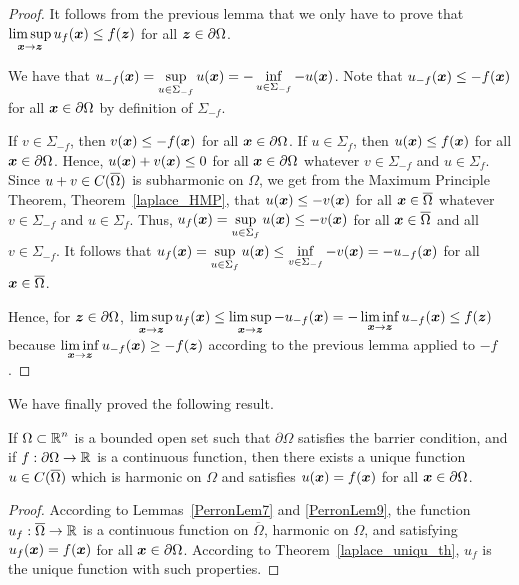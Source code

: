 \begin{proof}
It follows from the previous lemma that we only have to prove that
$\displaystyle \limsup_{{\bm{x}}\to {\bm{z}}} u_f({\bm{x}}) \leq f({\bm{z}})$
for all ${\bm{z}} \in \partial \Omega$.

We have that
$\displaystyle u_{-f}({\bm{x}}) = \sup_{u \in \Sigma_{-f}} u({\bm{x}})
= -\inf_{u \in \Sigma_{-f}} -u({\bm{x}})$.
Note that $u_{-f}({\bm{x}}) \leq -f({\bm{x}})$ for all
${\bm{x}} \in \partial \Omega$ by definition of $\Sigma_{-f}$.

If $v \in \Sigma_{-f}$, then $v({\bm{x}}) \leq -f({\bm{x}})$ for all
${\bm{x}} \in \partial \Omega$.
If $u \in \Sigma_f$, then $u({\bm{x}}) \leq f({\bm{x}})$ for all
${\bm{x}} \in \partial \Omega$.  Hence, $u({\bm{x}}) + v({\bm{x}}) \leq 0$
for all ${\bm{x}} \in \partial \Omega$ whatever
$v \in \Sigma_{-f}$ and $u \in \Sigma_f$.  Since
$\displaystyle u+v \in C(\overline{\Omega})$ is subharmonic
on $\Omega$, we get from the Maximum Principle Theorem,
Theorem~\ref{laplace_HMP}, that
$u({\bm{x}}) \leq -v({\bm{x}})$ for all ${\bm{x}} \in \overline{\Omega}$
whatever $v \in \Sigma_{-f}$ and $u \in \Sigma_f$.
Thus,
$\displaystyle u_f({\bm{x}}) = \sup_{u \in \Sigma_f} u({\bm{x}}) \leq -v({\bm{x}})$
for all ${\bm{x}} \in \overline{\Omega}$ and all $v \in \Sigma_{-f}$.
It follows that
$\displaystyle u_f({\bm{x}}) = \sup_{u \in \Sigma_f} u({\bm{x}})
\leq \inf_{v \in \Sigma_{-f}} -v({\bm{x}}) = -u_{-f}({\bm{x}})$
for all ${\bm{x}} \in \overline{\Omega}$.

Hence, for ${\bm{z}} \in \partial \Omega$,
$\displaystyle \limsup_{{\bm{x}} \to {\bm{z}}} u_f({\bm{x}})
\leq \limsup_{{\bm{x}} \to {\bm{z}}} -u_{-f}({\bm{x}})
= -\liminf_{{\bm{x}} \to {\bm{z}}} u_{-f}({\bm{x}})
\leq f({\bm{z}})$
because $\displaystyle \liminf_{{\bm{x}} \to {\bm{z}}} u_{-f}({\bm{x}})
\geq -f({\bm{z}})$ according to the previous lemma applied to $-f$.
\end{proof}

We have finally proved the following result.

\begin{theorem} \label{PerronExistTh}
If $\displaystyle \Omega \subset \mathbb{R}^n$ is a bounded open set such that
$\partial \Omega$ satisfies the barrier condition, and if
$\displaystyle f:\partial \Omega \to \mathbb{R}$ is a continuous function, then there
exists a unique function
$\displaystyle u \in C(\overline{\Omega})$ which is
harmonic on $\Omega$ and satisfies $u({\bm{x}}) = f({\bm{x}})$ for all
${\bm{x}} \in \partial \Omega$.
\end{theorem}

\begin{proof}
According to Lemmas~\ref{PerronLem7} and \ref{PerronLem9}, the function
$u_f: \overline{\Omega} \to \mathbb{R}$ is a continuous function on
$\overline{\Omega}$, harmonic on $\Omega$, and satisfying
$u_f({\bm{x}}) = f({\bm{x}})$ for all
${\bm{x}} \in \partial \Omega$.  According to
Theorem~\ref{laplace_uniqu_th}, $u_f$ is the unique function with such
properties.
\end{proof}

